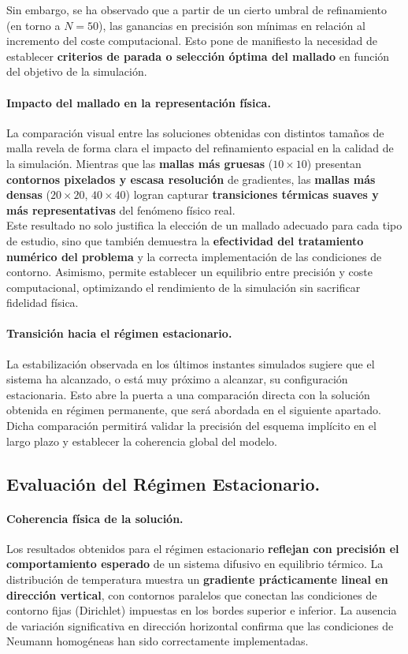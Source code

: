 \documentclass{article}
\begin{document}
Sin embargo, se ha observado que a partir de un cierto umbral de refinamiento (en torno a $N=50$), las ganancias en precisión son mínimas en relación al incremento del coste computacional. Esto pone de manifiesto la necesidad de establecer \textbf{criterios de parada o selección óptima del mallado} en función del objetivo de la simulación.

\paragraph{Impacto del mallado en la representación física.} La comparación visual entre las soluciones obtenidas con distintos tamaños de malla revela de forma clara el impacto del refinamiento espacial en la calidad de la simulación. Mientras que las \textbf{mallas más gruesas} ($10 \times 10$) presentan \textbf{contornos pixelados y escasa resolución} de gradientes, las \textbf{mallas más densas} ($20 \times 20$, $40 \times 40$) logran capturar \textbf{transiciones térmicas suaves y más representativas} del fenómeno físico real.\\

Este resultado no solo justifica la elección de un mallado adecuado para cada tipo de estudio, sino que también demuestra la \textbf{efectividad del tratamiento numérico del problema} y la correcta implementación de las condiciones de contorno. Asimismo, permite establecer un equilibrio entre precisión y coste computacional, optimizando el rendimiento de la simulación sin sacrificar fidelidad física.

\paragraph{Transición hacia el régimen estacionario.} La estabilización observada en los últimos instantes simulados sugiere que el sistema ha alcanzado, o está muy próximo a alcanzar, su configuración estacionaria. Esto abre la puerta a una comparación directa con la solución obtenida en régimen permanente, que será abordada en el siguiente apartado. Dicha comparación permitirá validar la precisión del esquema implícito en el largo plazo y establecer la coherencia global del modelo.


\subsection{Evaluación del Régimen Estacionario.}
\label{subsubsec:de}
\paragraph{Coherencia física de la solución.} Los resultados obtenidos para el régimen estacionario \textbf{reflejan con precisión el comportamiento esperado} de un sistema difusivo en equilibrio térmico. La distribución de temperatura muestra un \textbf{gradiente prácticamente lineal en dirección vertical}, con contornos paralelos que conectan las condiciones de contorno fijas (Dirichlet) impuestas en los bordes superior e inferior. La ausencia de variación significativa en dirección horizontal confirma que las condiciones de Neumann homogéneas han sido correctamente implementadas.\\
\end{document}
